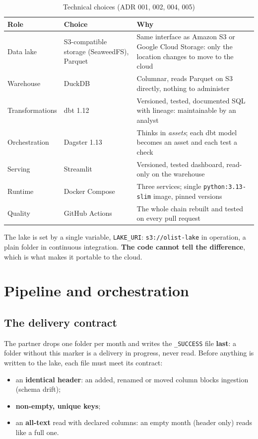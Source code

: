 \documentclass[11pt, a4paper, oneside, headings=normal, numbers=noenddot, DIV=12]{scrartcl}
\begin{document}
\begin{table}[H]
\centering\small
\begin{tabularx}{\linewidth}{@{}L{2.6cm} L{3.6cm} Y@{}}
\toprule
\textbf{Role} & \textbf{Choice} & \textbf{Why} \\
\midrule
Data lake & S3-compatible storage (SeaweedFS), Parquet & Same interface as Amazon S3 or Google Cloud Storage: only the location changes to move to the cloud \\
Warehouse & DuckDB & Columnar, reads Parquet on S3 directly, nothing to administer \\
Transformations & dbt 1.12 & Versioned, tested, documented SQL with lineage: maintainable by an analyst \\
Orchestration & Dagster 1.13 & Thinks in \emph{assets}; each dbt model becomes an asset and each test a check \\
Serving & Streamlit & Versioned, tested dashboard, read-only on the warehouse \\
Runtime & Docker Compose & Three services; single \texttt{python:3.13-slim} image, pinned versions \\
Quality & GitHub Actions & The whole chain rebuilt and tested on every pull request \\
\bottomrule
\end{tabularx}
\caption{Technical choices (ADR 001, 002, 004, 005)}
\end{table}

The lake is set by a single variable, \texttt{LAKE\_URI}: \texttt{s3://olist-lake} in operation, a plain folder in continuous integration.
\textbf{The code cannot tell the difference}, which is what makes it portable to the cloud.

\section{Pipeline and orchestration}

\subsection{The delivery contract}
The partner drops one folder per month and writes the \texttt{\_SUCCESS} file \textbf{last}: a folder without this marker is a delivery
in progress, never read. Before anything is written to the lake, each file must meet its contract:

\begin{itemize}[leftmargin=1.2em]
  \item an \textbf{identical header}: an added, renamed or moved column blocks ingestion (schema drift);
  \item \textbf{non-empty, unique keys};
  \item an \textbf{all-text} read with declared columns: an empty month (header only) reads like a full one.
\end{itemize}
\end{document}
